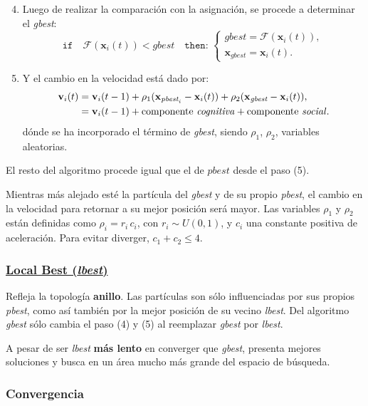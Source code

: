 \documentclass[10pt,a4paper]{article}
\begin{document}
\begin{enumerate}
\setcounter{enumi}{3}
\item Luego de realizar la comparación con la asignación, se procede a determinar el \textit{gbest}:
\[
	\texttt{if} \quad \mathcal{F} (\mathbf{x}_i(t)) < \textit{gbest} \quad \texttt{then: } \left\{
	\begin{array}{l}
	\textit{gbest} = \mathcal{F}(\mathbf{x}_i(t)),\\
	\mathbf{x}_{\textit{gbest}} = \mathbf{x}_i(t).
	\end{array}
	\right.
\]
\item Y el cambio en la velocidad está dado por:
\begin{align*}
\mathbf{v}_{i}(t) &= \mathbf{v}_{i}(t-1) + \rho_1(\mathbf{x}_{\textit{pbest}_i}- \mathbf{x}_i(t)) + \rho_2(\mathbf{x}_{\textit{gbest}}- \mathbf{x}_i(t)),\\
&= \mathbf{v}_{i}(t-1) + \text{componente \textit{cognitiva}} + \text{componente \textit{social}}.
\end{align*}
dónde se ha incorporado el término de \textit{gbest}, siendo $\rho_1$, $\rho_2$, variables aleatorias.
\end{enumerate}

El resto del algoritmo procede igual que el de $pbest$ desde el paso (5).

Mientras más alejado esté la partícula del \textit{gbest} y de su propio \textit{pbest}, el cambio en la velocidad para retornar a su mejor posición será mayor. Las variables $\rho_1$ y $\rho_2$ están definidas como $\rho_i=r_i\,c_i$, con $r_i \sim U(0,1)$, y $c_i$ una constante positiva de aceleración. Para evitar diverger, $c_1 + c_2 \leq 4$.

\subsubsection*{\underline{Local Best (\textit{lbest})}}

Refleja la topología \textbf{anillo}. Las partículas son sólo influenciadas por sus propios \textit{pbest}, como así también por la mejor posición de su vecino \textit{lbest}. Del algoritmo \textit{gbest} sólo cambia el paso (4) y (5) al reemplazar \textit{gbest} por \textit{lbest}.

A pesar de ser \textit{lbest} \textbf{más lento} en converger que \textit{gbest}, presenta mejores soluciones y busca en un área mucho más grande del espacio de búsqueda.

\subsubsection{Convergencia}
\end{document}
